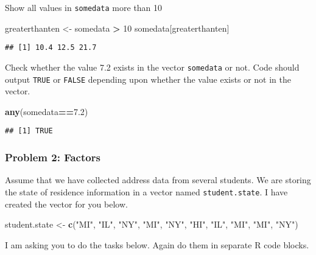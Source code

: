\documentclass[]{article}
\newenvironment{Shaded}{\begin{snugshade}}{\end{snugshade}}
\newcommand{\KeywordTok}[1]{\textcolor[rgb]{0.13,0.29,0.53}{\textbf{#1}}}
\newcommand{\DecValTok}[1]{\textcolor[rgb]{0.00,0.00,0.81}{#1}}
\newcommand{\FloatTok}[1]{\textcolor[rgb]{0.00,0.00,0.81}{#1}}
\newcommand{\StringTok}[1]{\textcolor[rgb]{0.31,0.60,0.02}{#1}}
\newcommand{\OperatorTok}[1]{\textcolor[rgb]{0.81,0.36,0.00}{\textbf{#1}}}
\newcommand{\NormalTok}[1]{#1}
\begin{document}
Show all values in \texttt{somedata} more than 10

\begin{Shaded}
\begin{Highlighting}[]
\NormalTok{greaterthanten <-}\StringTok{ }\NormalTok{somedata }\OperatorTok{>}\StringTok{ }\DecValTok{10}
\NormalTok{somedata[greaterthanten]}
\end{Highlighting}
\end{Shaded}

\begin{verbatim}
## [1] 10.4 12.5 21.7
\end{verbatim}

Check whether the value 7.2 exists in the vector \texttt{somedata} or
not. Code should output \texttt{TRUE} or \texttt{FALSE} depending upon
whether the value exists or not in the vector.

\begin{Shaded}
\begin{Highlighting}[]
\KeywordTok{any}\NormalTok{(somedata}\OperatorTok{==}\FloatTok{7.2}\NormalTok{)}
\end{Highlighting}
\end{Shaded}

\begin{verbatim}
## [1] TRUE
\end{verbatim}

\subsubsection{Problem 2: Factors}\label{problem-2-factors}

Assume that we have collected address data from several students. We are
storing the state of residence information in a vector named
\texttt{student.state}. I have created the vector for you below.

\begin{Shaded}
\begin{Highlighting}[]
\NormalTok{student.state <-}\StringTok{ }\KeywordTok{c}\NormalTok{(}\StringTok{"MI"}\NormalTok{, }\StringTok{"IL"}\NormalTok{, }\StringTok{"NY"}\NormalTok{, }\StringTok{"MI"}\NormalTok{, }\StringTok{"NY"}\NormalTok{, }\StringTok{"HI"}\NormalTok{, }\StringTok{"IL"}\NormalTok{, }\StringTok{"MI"}\NormalTok{, }\StringTok{"MI"}\NormalTok{, }\StringTok{"NY"}\NormalTok{)}
\end{Highlighting}
\end{Shaded}

I am asking you to do the tasks below. Again do them in separate R code
blocks.
\end{document}
